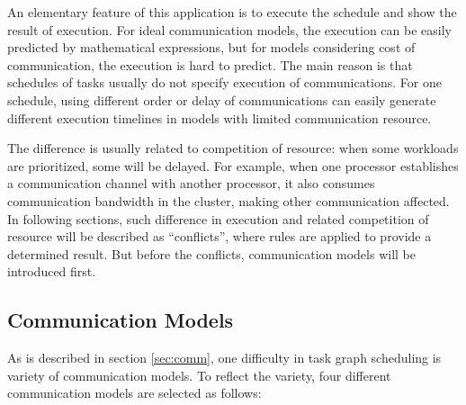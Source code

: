 \documentclass[msc,deptreport, cs]{infthesis}
\begin{document}
An elementary feature of this application is to execute the schedule and show the result of execution. For ideal communication models, the execution can be easily predicted by mathematical expressions, but for models considering cost of communication, the execution is hard to predict. The main reason is that schedules of tasks usually do not specify execution of communications. For one schedule, using different order or delay of communications can easily generate different execution timelines in models with limited communication resource. 

The difference is usually related to competition of resource: when some workloads are prioritized, some will be delayed. For example, when one processor establishes a communication channel with another processor, it also consumes communication bandwidth in the cluster, making other communication affected. In following sections, such difference in execution and related competition of resource will be described as ``conflicts'', where rules are applied to provide a determined result. But before the conflicts, communication models will be introduced first.

\subsection{Communication Models}

As is described in section \ref{sec:comm}, one difficulty in task graph scheduling is variety of communication models. To reflect the variety, four different communication models are selected as follows:
\end{document}
